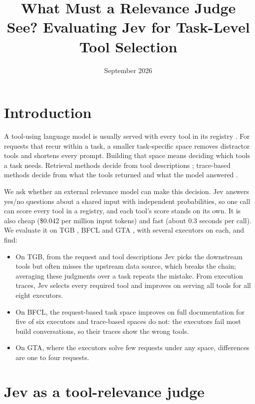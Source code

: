 \documentclass[11pt]{tea}
\title{What Must a Relevance Judge See? Evaluating Jev for Task-Level Tool Selection}
\date{September 2026}
\begin{document}
\maketitle

\section{Introduction}

A tool-using language model is usually served with every tool in its registry \citep{toolformer,gorilla,qin2024toolllm}. For requests that recur within a task, a smaller task-specific space removes distractor tools and shortens every prompt. Building that space means deciding which tools a task needs. Retrieval methods decide from tool descriptions \citep{xiao2024cpack,tool2vec}; trace-based methods decide from what the tools returned and what the model answered \citep{zheng2023judging}.

We ask whether an external relevance model can make this decision. Jev \citep{jevdocs} answers yes/no questions about a shared input with independent probabilities, so one call can score every tool in a registry, and each tool's score stands on its own. It is also cheap (\$0.042 per million input tokens) and fast (about 0.3 seconds per call). We evaluate it on TGB \citep{tgb2026}, BFCL \citep{bfcl} and GTA \citep{gta}, with several executors on each, and find:
\begin{itemize}[leftmargin=*,itemsep=1pt,topsep=2pt]
  \item On TGB, from the request and tool descriptions Jev picks the downstream tools but often misses the upstream data source, which breaks the chain; averaging these judgments over a task repeats the mistake. From execution traces, Jev selects every required tool and improves on serving all tools for all eight executors.
  \item On BFCL, the request-based task space improves on full documentation for five of six executors and trace-based spaces do not: the executors fail most build conversations, so their traces show the wrong tools.
  \item On GTA, where the executors solve few requests under any space, differences are one to four requests.
\end{itemize}

\section{Jev as a tool-relevance judge}
\end{document}
